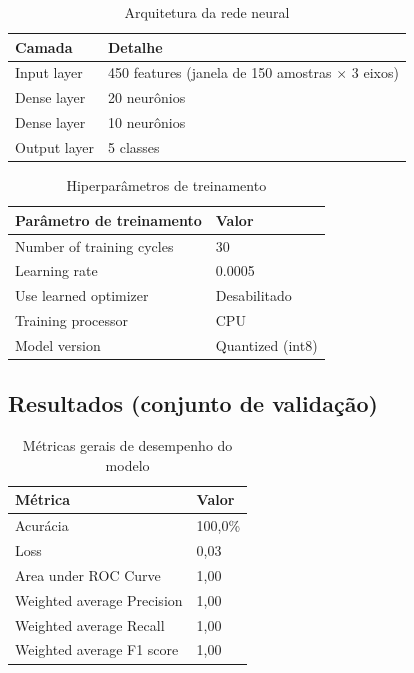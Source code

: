 \documentclass[11pt,a4paper]{article}
\begin{document}
\begin{table}[h]
\centering
\begin{tabular}{ll}
\toprule
\textbf{Camada} & \textbf{Detalhe} \\
\midrule
Input layer & 450 features (janela de 150 amostras $\times$ 3 eixos) \\
Dense layer & 20 neurônios \\
Dense layer & 10 neurônios \\
Output layer & 5 classes \\
\bottomrule
\end{tabular}
\caption{Arquitetura da rede neural}
\end{table}

\begin{table}[h]
\centering
\begin{tabular}{ll}
\toprule
\textbf{Parâmetro de treinamento} & \textbf{Valor} \\
\midrule
Number of training cycles & 30 \\
Learning rate & 0.0005 \\
Use learned optimizer & Desabilitado \\
Training processor & CPU \\
Model version & Quantized (int8) \\
\bottomrule
\end{tabular}
\caption{Hiperparâmetros de treinamento}
\end{table}

\subsection{Resultados (conjunto de validação)}
\begin{table}[h]
\centering
\begin{tabular}{ll}
\toprule
\textbf{Métrica} & \textbf{Valor} \\
\midrule
Acurácia & 100,0\% \\
Loss & 0,03 \\
Area under ROC Curve & 1,00 \\
Weighted average Precision & 1,00 \\
Weighted average Recall & 1,00 \\
Weighted average F1 score & 1,00 \\
\bottomrule
\end{tabular}
\caption{Métricas gerais de desempenho do modelo}
\end{table}
\end{document}
